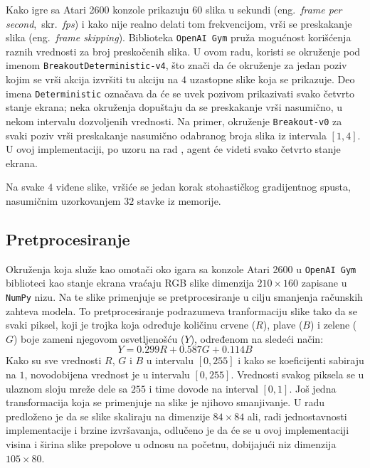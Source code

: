 \par 
Kako igre sa Atari 2600 konzole prikazuju $60$ slika u sekundi (eng.~{\em frame per second},~skr.~{\em fps}) i kako nije realno delati tom frekvencijom, vrši se preskakanje slika (eng.~{\em frame skipping}). Biblioteka \texttt{OpenAI Gym} pruža mogućnost korišćenja raznih vrednosti za broj preskočenih slika. U ovom radu, koristi se okruženje pod imenom \texttt{BreakoutDeterministic-v4}, što znači da će okruženje za jedan poziv kojim se vrši akcija izvršiti tu akciju na $4$ uzastopne slike koja se prikazuje. Deo imena \texttt{Deterministic} označava da će se uvek pozivom prikazivati svako četvrto stanje ekrana; neka okruženja dopuštaju da se preskakanje vrši nasumično, u nekom intervalu dozvoljenih vrednosti. Na primer, okruženje \texttt{Breakout-v0} za svaki poziv vrši preskakanje nasumično odabranog broja slika iz intervala $[1,4]$. U ovoj implementaciji, po uzoru na rad \cite{dqn_dm}, agent će videti svako četvrto stanje ekrana. 
\par 
Na svake $4$ viđene slike, vršiće se jedan korak stohastičkog gradijentnog spusta, nasumičnim uzorkovanjem $32$ stavke iz memorije.

\subsection{Pretprocesiranje}
\label{ss:pretprocesiranje}
Okruženja koja služe kao omotači oko igara sa konzole Atari 2600 u \texttt{OpenAI Gym} biblioteci kao stanje ekrana vraćaju RGB slike dimenzija $210 \times 160$ zapisane u \texttt{NumPy} nizu. Na te slike primenjuje se pretprocesiranje u cilju smanjenja računskih zahteva modela. To pretprocesiranje podrazumeva tranformaciju slike tako da se svaki piksel, koji je trojka koja određuje količinu crvene ($R$), plave ($B$) i zelene ($G$) boje zameni njegovom osvetljenošću ($Y$), određenom na sledeći način:
\begin{equation}
\label{eq:lum}
	Y = 0.299 R + 0.587 G + 0.114 B
\end{equation}
Kako su sve vrednosti $R$, $G$ i $B$ u intervalu $[0, 255]$ i kako se koeficijenti sabiraju na $1$, novodobijena vrednost je u intervalu $[0, 255]$. Vrednosti svakog piksela se u ulaznom sloju mreže dele sa $255$ i time dovode na interval $[0, 1]$. Još jedna transformacija koja se primenjuje na slike je njihovo smanjivanje. U radu \cite{dqn_dm} predloženo je da se slike skaliraju na dimenzije $84 \times 84$ ali, radi jednostavnosti implementacije i brzine izvršavanja, odlučeno je da će se u ovoj implementaciji visina i širina slike prepolove u odnosu na početnu, dobijajući niz dimenzija $105 \times 80$.

